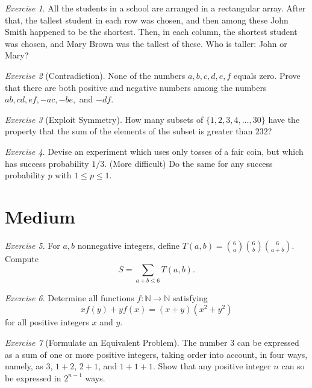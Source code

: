 \documentclass{article}
\theoremstyle{definition}
\theoremstyle{remark}
\newtheorem{exercise}{Exercise}
\begin{document}
\begin{exercise}
All the students in a school are arranged in a rectangular array. After that, the tallest student in each row was chosen, and then among these John Smith happened to be the shortest. Then, in each column, the shortest student was chosen, and Mary Brown was the tallest of these. Who is taller: John or Mary?
\end{exercise}

\begin{exercise}[Contradiction]
None of the numbers $a,b,c,d,e,f$ equals zero. Prove that there are both positive and negative numbers among the numbers $ab,cd,ef,-ac,-be,$ and $-df$.
\end{exercise}

\begin{exercise}[Exploit Symmetry]
How many subsets of $\{1,2,3,4,\dots,30\}$ have the property that the sum of the elements of the subset is greater than $232$?
\end{exercise}

\begin{exercise}
Devise an experiment which uses only tosses of a fair coin, but which has success probability $1/3$. (More difficult) Do the same for any success probability $p$ with $1\leq p\leq 1$.
\end{exercise}

\section{Medium}
\begin{exercise}
For $a, b$ nonnegative integers, define $T(a, b) = \binom{6}{a}\binom{6}{b}\binom{6}{a + b}$. Compute
\[S = \sum_{a + b \leq 6} T(a, b).
\]
\end{exercise}

\begin{exercise}
Determine all functions $f: \mathbb{N} \rightarrow \mathbb{N}$ satisfying 
\[xf(y) + yf(x) = (x + y)(x^2 + y^2)
\]
for all positive integers $x$ and $y$. 
\end{exercise}

\begin{exercise}[Formulate an Equivalent Problem]
The number $3$ can be expressed as a sum of one or more positive integers, taking order into account, in four ways, namely, as $3$, $1+2$, $2+1$, and $1+1+1$. Show that any positive integer $n$ can so be expressed in $2^{n-1}$ ways.
\end{exercise}
\end{document}
